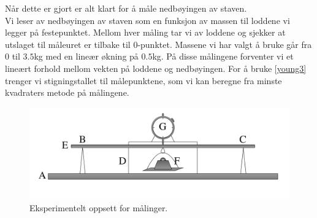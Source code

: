 \documentclass[%
 reprint,
 amsmath,amssymb,
 aps,
]{revtex4-1}
\begin{document}
Når dette er gjort er alt klart for å måle nedbøyingen av staven.\\
Vi leser av nedbøyingen av staven som en funksjon av massen til loddene vi legger på festepunktet. Mellom hver måling tar vi av loddene og sjekker at utslaget til måleuret er tilbake til $0$-punktet. Massene vi har valgt å bruke går fra $0$ til $3.5$kg med en lineær økning på $0.5$kg. På disse målingene forventer vi et lineært forhold mellom vekten på loddene og nedbøyingen. For å bruke \eqref{young3} trenger vi stigningstallet til målepunktene, som vi kan beregne fra minste kvadraters metode på målingene. \\
\begin{figure}
  \centering
  \includegraphics[scale=0.17]{oppsett.png}
  \caption{Eksperimentelt oppsett for målinger.}
  \label{eksperiment}
\end{figure}
\end{document}

